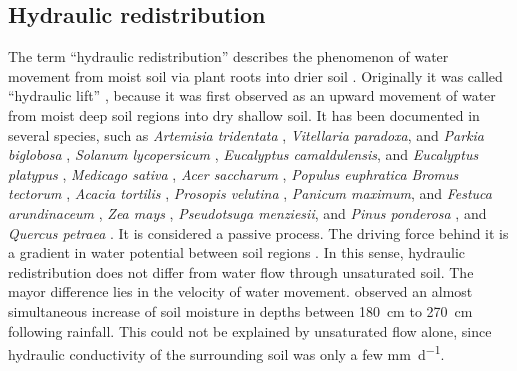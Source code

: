 \subsection{Hydraulic redistribution}

The term ``hydraulic redistribution'' describes the phenomenon of water movement from moist soil via plant roots into drier soil \parencite{burgess_redistribution_1998}.  Originally it was called ``hydraulic lift'' \parencite{richards_hydraulic_1987}, because it was first observed as an upward movement of water from moist deep soil regions into dry shallow soil.  It has been documented in several species, such as
\emph{Artemisia tridentata} \parencite{richards_hydraulic_1987},
\emph{Vitellaria paradoxa}, and \emph{Parkia biglobosa} \parencite{bayala_hydraulic_2008},
\emph{Solanum lycopersicum} \parencite{bormann_moisture_1957},
\emph{Eucalyptus camaldulensis}, and \emph{Eucalyptus platypus} \parencite{burgess_tree_2001},
\emph{Medicago sativa} \parencite{corak_water_1987},
\emph{Acer saccharum} \parencite{dawson_hydraulic_1993},
\emph{Populus euphratica} \parencite{hao_hydraulic_2010}
\emph{Bromus tectorum} \parencite{leffler_hydraulic_2005},
\emph{Acacia tortilis} \parencite{ludwig_hydraulic_2003},
\emph{Prosopis velutina} \parencite{scott_ecohydrologic_2008},
\emph{Panicum maximum}, and \emph{Festuca arundinaceum} \parencite{sekiya_applying_2011},
\emph{Zea mays} \parencite{wan_hydraulic_2000},
\emph{Pseudotsuga menziesii}, and \emph{Pinus ponderosa} \parencite{warren_hydraulic_2007}, and
\emph{Quercus petraea} \parencite{zapater_evidence_2011}.
It is considered a passive process.  The driving force behind it is a gradient in water potential between soil regions \parencite{scott_ecohydrologic_2008}.  In this sense, hydraulic redistribution does not differ from water flow through unsaturated soil.  The mayor difference lies in the velocity of water movement.  \textcite{burgess_tree_2001} observed an almost simultaneous increase of soil moisture in depths between \SI{180}{cm} to \SI{270}{cm} following rainfall.  This could not be explained by unsaturated flow alone, since hydraulic conductivity of the surrounding soil was only a few \si{\milli\metre\per\day}.

